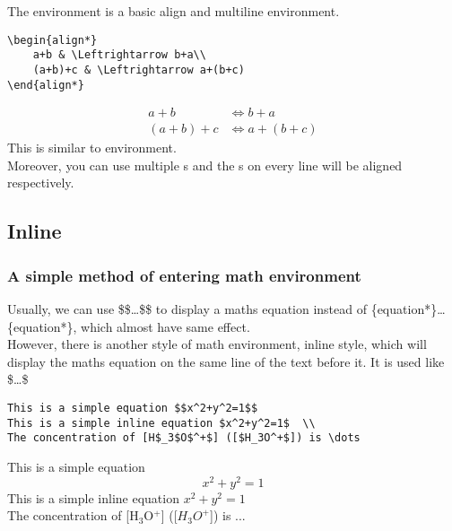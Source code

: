 \begin{frame}[fragile]
	The  environment is a basic align and multiline environment.\\
	\begin{example}
		\begin{verbatim}
\begin{align*}
    a+b & \Leftrightarrow b+a\\
    (a+b)+c & \Leftrightarrow a+(b+c)
\end{align*}
		\end{verbatim}
	\end{example}
	\begin{align*}
		a+b&\Leftrightarrow b+a\\
		(a+b)+c&\Leftrightarrow a+(b+c)
	\end{align*}
	This is similar to  environment.
	\\Moreover, you can use multiple \structure{\&}s and the \structure{\&}s on every line will be aligned respectively.
\end{frame}

\subsection{Inline}

\begin{frame}[fragile]
	\frametitle{A simple method of entering math environment}
	Usually, we can use \alert{\$\$}\dots\alert{\$\$} to display a maths equation instead of \{equation*\}\dots{}\{equation*\}, which almost have same effect.\\[0.5em]
	However, there is another style of math environment, inline style, which will display the maths equation on the same line of the text before it. It is used like \alert{\$}\dots\alert{\$}
	\begin{example}
		\begin{verbatim}
This is a simple equation $$x^2+y^2=1$$
This is a simple inline equation $x^2+y^2=1$  \\
The concentration of [H$_3$O$^+$] ([$H_3O^+$]) is \dots
		\end{verbatim}
	\end{example}
		This is a simple equation $$x^2+y^2=1$$
		This is a simple inline equation $x^2+y^2=1$  \\
		The concentration of [H$_3$O$^+$] ([$H_3O^+$]) is ...
\end{frame}

